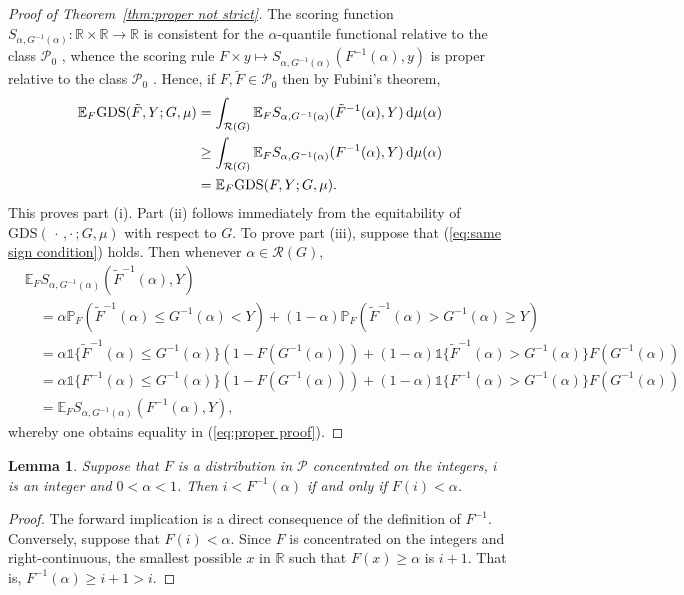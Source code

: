 \documentclass[10pt]{article} %
\theoremstyle{theorem}
\newtheorem{lem}{Lemma}
\theoremstyle{definition}
\newcommand{\RRR}{\mathbb{R}}
\newcommand{\EEE}{\mathbb{E}}
\newcommand{\PPP}{\mathbb{P}}
\newcommand{\dd}{\mathrm{d}}
\newcommand{\one}{\mathds{1}}
\newcommand{\GDS}{\mathrm{GDS}}
\newcommand{\RG}{\mathcal{R}(G)}
\newcommand{\twocdots}{\,\cdot\,,\cdot\,}
\begin{document}
\begin{proof}[Proof of Theorem~\ref{thm:proper not strict}]
The scoring function $S_{\alpha,G^{-1}(\alpha)}:\RRR\times\RRR\to\RRR$ is consistent for the $\alpha$-quantile functional relative to the class $\mathcal{P}_0$ \citep{gneiting2011quantiles}, whence the scoring rule $F\times y\mapsto S_{\alpha,G^{-1}(\alpha)}(F^{-1}(\alpha),y)$ is proper relative to the class $\mathcal{P}_0$ \citep[Theorem~3]{gneiting2011making}. Hence, if $F,\tilde{F}\in\mathcal{P}_0$ then by Fubini's theorem,
\begin{align}
\EEE_F \GDS(\tilde{F},Y;G,\mu)
&= \int_{\RG} \EEE_F S_{\alpha,G^{-1}(\alpha)}(\tilde{F}^{-1}(\alpha),Y)\,\dd\mu(\alpha) \notag\\
& \geq  \int_{\RG} \EEE_F S_{\alpha,G^{-1}(\alpha)}(F^{-1}(\alpha),Y)\,\dd\mu(\alpha) \notag\\
&= \EEE_F \GDS(F,Y;G,\mu). \label{eq:proper proof}
\end{align}
This proves part (i). Part (ii) follows immediately from the equitability of $\GDS(\twocdots;G,\mu)$ with respect to $G$. To prove part (iii), suppose that (\ref{eq:same sign condition}) holds. Then whenever $\alpha\in\RG$,
\begin{align*}
&\EEE_F S_{\alpha,G^{-1}(\alpha)}(\tilde{F}^{-1}(\alpha),Y) \\
&\quad= \alpha \PPP_F(\tilde{F}^{-1}(\alpha) \leq G^{-1}(\alpha) < Y) + (1-\alpha) \PPP_F(\tilde{F}^{-1}(\alpha) > G^{-1}(\alpha) \geq Y) \\
&\quad= \alpha\one\{\tilde{F}^{-1}(\alpha) \leq G^{-1}(\alpha)\}(1-F(G^{-1}(\alpha))) +(1-\alpha) \one\{\tilde{F}^{-1}(\alpha) > G^{-1}(\alpha) \} F(G^{-1}(\alpha)) \\
&\quad= \alpha\one\{F^{-1}(\alpha) \leq G^{-1}(\alpha)\}(1-F(G^{-1}(\alpha))) +(1-\alpha) \one\{F^{-1}(\alpha) > G^{-1}(\alpha) \} F(G^{-1}(\alpha)) \\
&\quad=  \EEE_F S_{\alpha,G^{-1}(\alpha)}(F^{-1}(\alpha),Y),
\end{align*}
whereby one obtains equality in (\ref{eq:proper proof}).
\end{proof}


\begin{lem}\label{lem:F on integers}
Suppose that $F$ is a distribution in $\mathcal{P}$ concentrated on the integers, $i$ is an integer and $0<\alpha<1$. Then $i<F^{-1}(\alpha)$ if and only if $F(i)<\alpha$.
\end{lem}

\begin{proof}
The forward implication is a direct consequence of the definition of $F^{-1}$. Conversely, suppose that $F(i)<\alpha$. Since $F$ is concentrated on the integers and right-continuous, the smallest possible $x$ in $\RRR$ such that $F(x)\geq \alpha$ is $i+1$. That is, $F^{-1}(\alpha)\geq i+1>i$.
\end{proof}
\end{document}
